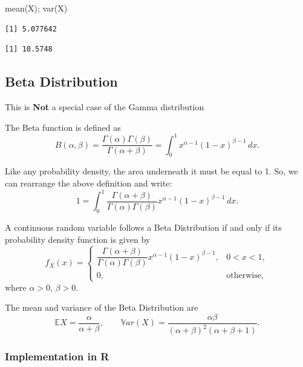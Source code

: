 \documentclass[
  letterpaper,
  DIV=11,
  numbers=noendperiod]{scrreprt}
\newenvironment{Shaded}{\begin{snugshade}}{\end{snugshade}}
\newcommand{\FunctionTok}[1]{\textcolor[rgb]{0.28,0.35,0.67}{#1}}
\newcommand{\NormalTok}[1]{\textcolor[rgb]{0.00,0.23,0.31}{#1}}
\begin{document}
\begin{Shaded}
\begin{Highlighting}[]
\FunctionTok{mean}\NormalTok{(X);  }\FunctionTok{var}\NormalTok{(X)}
\end{Highlighting}
\end{Shaded}

\begin{verbatim}
[1] 5.077642
\end{verbatim}

\begin{verbatim}
[1] 10.5748
\end{verbatim}

\subsection{Beta Distribution}\label{beta-distribution}

This is \textbf{Not} a special case of the Gamma distribution

The Beta function is defined as \[
B(\alpha, \beta) = \frac{\Gamma(\alpha)\Gamma(\beta)}{\Gamma(\alpha + \beta)}
= \int_0^1 x^{\alpha - 1} (1-x)^{\beta - 1} \, dx.\]

Like any probability density, the area underneath it must be equal to 1.
So, we can rearrange the above definition and write:
\[1 = \int_0^1 \frac{\Gamma(\alpha+\beta)}{\Gamma(\alpha)\Gamma(\beta)}
x^{\alpha-1} (1-x)^{\beta-1} \, dx.\]

A continuous random variable follows a Beta Distribution if and only if
its probability density function is given by \[
f_X(x) =
\begin{cases}
\dfrac{\Gamma(\alpha+\beta)}{\Gamma(\alpha)\Gamma(\beta)}
x^{\alpha-1}(1-x)^{\beta-1}, & 0 < x < 1, \\[2ex]
0, & \text{otherwise},
\end{cases}\] where \(\alpha > 0\), \(\beta > 0\).

The mean and variance of the Beta Distribution are
\[\mathbb{E}X = \frac{\alpha}{\alpha + \beta},
\qquad
\mathbb{V}ar(X) = \frac{\alpha \beta}{(\alpha + \beta)^2 (\alpha + \beta + 1)}.
\]

\subsubsection{Implementation in R}\label{implementation-in-r-7}
\end{document}
